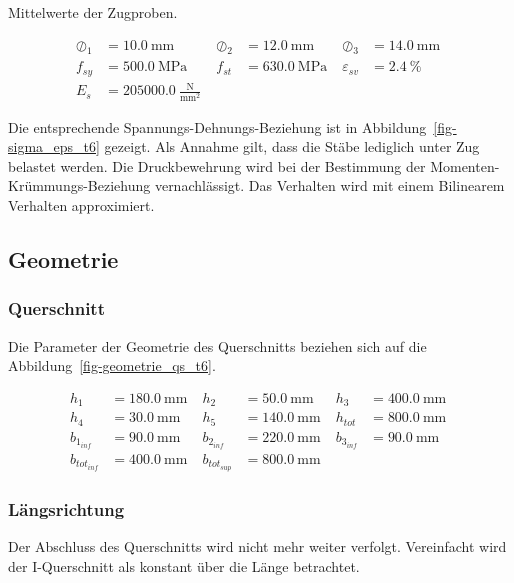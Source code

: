 \documentclass[
  11pt,
  letterpaper,
]{scrreprt}
\begin{document}
Mittelwerte der Zugproben.

$$
\begin{aligned}
\oslash_{1} &= 10.0\ \mathrm{mm} \; 
 &\oslash_{2} &= 12.0\ \mathrm{mm} \; 
 &\oslash_{3} &= 14.0\ \mathrm{mm} \; 
\\[10pt]
 f_{sy} &= 500.0\ \mathrm{MPa} \; 
 &f_{st} &= 630.0\ \mathrm{MPa} \; 
 &\varepsilon_{sv} &= 2.4\ \mathrm{\%} \; 
\\[10pt]
 E_{s} &= 205000.0\ \frac{\mathrm{N}}{\mathrm{mm}^{2}} \;
\end{aligned}
$$

Die entsprechende Spannungs-Dehnungs-Beziehung ist in
Abbildung~\ref{fig-sigma_eps_t6} gezeigt. Als Annahme gilt, dass die
Stäbe lediglich unter Zug belastet werden. Die Druckbewehrung wird bei
der Bestimmung der Momenten-Krümmungs-Beziehung vernachlässigt. Das
Verhalten wird mit einem Bilinearem Verhalten approximiert.

\subsection{Geometrie}\label{geometrie}

\subsubsection{Querschnitt}\label{querschnitt}

Die Parameter der Geometrie des Querschnitts beziehen sich auf die
Abbildung~\ref{fig-geometrie_qs_t6}.

$$
\begin{aligned}
h_{1} &= 180.0\ \mathrm{mm} \; 
 &h_{2} &= 50.0\ \mathrm{mm} \; 
 &h_{3} &= 400.0\ \mathrm{mm} \; 
\\[10pt]
 h_{4} &= 30.0\ \mathrm{mm} \; 
 &h_{5} &= 140.0\ \mathrm{mm} \; 
 &h_{tot} &= 800.0\ \mathrm{mm} \; 
\\[10pt]
 b_{1_{inf}} &= 90.0\ \mathrm{mm} \; 
 &b_{2_{inf}} &= 220.0\ \mathrm{mm} \; 
 &b_{3_{inf}} &= 90.0\ \mathrm{mm} \; 
\\[10pt]
 b_{tot_{inf}} &= 400.0\ \mathrm{mm} \; 
 &b_{tot_{sup}} &= 800.0\ \mathrm{mm} \;
\end{aligned}
$$

\subsubsection{Längsrichtung}\label{luxe4ngsrichtung}

Der Abschluss des Querschnitts wird nicht mehr weiter verfolgt.
Vereinfacht wird der I-Querschnitt als konstant über die Länge
betrachtet.
\end{document}
